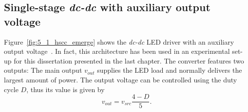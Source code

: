 \subsection{Single-stage \emph{dc-dc} with auxiliary output voltage}

Figure~\ref{fig:5_1_hscc_emerge} shows the \emph{dc-dc} LED driver with an auxiliary output voltage~\cite{WO2015/040564}.
In fact, this architecture has been used in an experimental set-up for this dissertation presented in the last chapter. The converter features two outputs: The main output $v_{out}$ supplies the LED load and normally delivers the largest amount of power. The output voltage can be controlled using the duty cycle $D$, thus its value is given by
\begin{equation}
v_{out} =  v_{src}  \frac{4 - D }{5}.
\label{eq:dc_dc_vout}
\end{equation}

